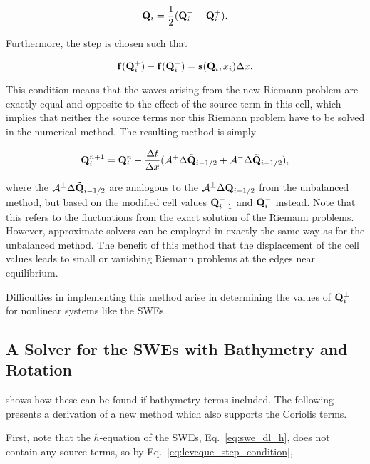 \begin{equation}
  \label{eq:leveque_avg_condition}
  \vb Q_i = \frac{1}{2}(\vb Q_i^- + \vb Q_i^+).
\end{equation}

Furthermore, the step is chosen such that

\begin{equation}
  \label{eq:leveque_step_condition}
  \vb f(\vb Q_i^+) - \vb f(\vb Q_i^-) = \vb s(\vb Q_i, x_i) \Delta x.
\end{equation}

This condition means that the waves arising from the new Riemann problem are exactly equal and opposite to the effect of the source term in this cell, which implies that neither the source terms nor this Riemann problem have to be solved in the numerical method. The resulting method is simply

\begin{equation}
  \vb Q_i^{n+1} = \vb Q_i^n - \frac{\Delta t}{\Delta x} (\mathcal{A}^+ \Delta \vb{\tilde Q}_{i-1/2} + \mathcal{A}^- \Delta \vb{\tilde Q}_{i+1/2}),
\end{equation}

where the $\mathcal{A}^\pm \Delta \vb{\tilde Q}_{i-1/2}$ are analogous to the $\mathcal{A}^\pm \Delta \vb{Q}_{i-1/2}$ from the unbalanced method, but based on the modified cell values $\vb Q_{i-1}^+$ and $\vb Q_i^-$ instead. Note that this refers to the fluctuations from the exact solution of the Riemann problems. However, approximate solvers can be employed in exactly the same way as for the unbalanced method. The benefit of this method that the displacement of the cell values leads to small or vanishing Riemann problems at the edges near equilibrium.

Difficulties in implementing this method arise in determining the values of $\vb Q_i^\pm$ for nonlinear systems like the SWEs.

\subsection{A Solver for the SWEs with Bathymetry and Rotation}
\label{sec:leveque}

\citet{leveque1998balancing} shows how these can be found if bathymetry terms included. The following presents a derivation of a new method which also supports the Coriolis terms.

First, note that the $h$-equation of the SWEs, Eq.~\ref{eq:swe_dl_h}, does not contain any source terms, so by Eq.~\ref{eq:leveque_step_condition},

